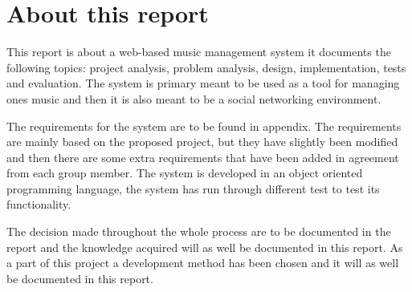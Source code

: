 \section{About this report}
This report is about a web-based music management system it documents the following topics: project analysis, problem analysis, design, implementation, tests and evaluation. The system is primary meant to be used as a tool for managing ones music and then it is also meant to be a social networking environment.

The requirements for the system are to be found in appendix. The requirements are mainly based on the proposed project, but they have slightly been modified and then there are some extra requirements that have been added in agreement from each group member. The system is developed in an object oriented programming language, the system has run through different test to test its functionality.

The decision made throughout the whole process are to be documented in the report and the knowledge acquired will as well be documented in this report. As a part of this project a development method has been chosen and it will as well be documented in this report.